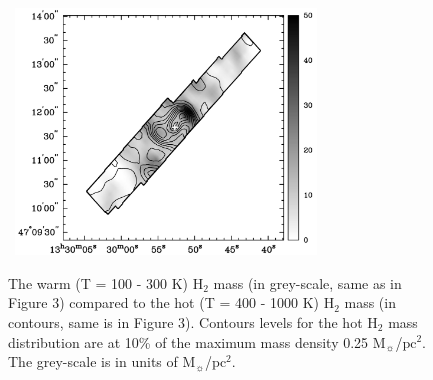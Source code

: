 \documentclass[manuscript]{aastex}
\begin{document}
\clearpage
\begin{figure}[!h]
\centerline{\hbox{\hspace{0.0in}
\includegraphics[width=8cm,angle=0]{bw_warm_v_hot.jpg}}}
\caption{The warm (T = 100 - 300 K) $\mathrm{H_2}$ mass (in grey-scale, same as in Figure 3) compared to the hot (T = 400 - 1000 K) $\mathrm{H_2}$ mass (in contours, same is in Figure 3).  Contours levels for the hot $\mathrm{H_2}$ mass distribution are at 10\% of the maximum mass density 0.25 $\mathrm{M_\sun}$/$\mathrm{pc^2}$. 
The grey-scale is in units of $\mathrm{M_\sun}$/$\mathrm{pc^2}$.
\label{fig6}}
\end{figure}


\clearpage
\end{document}
